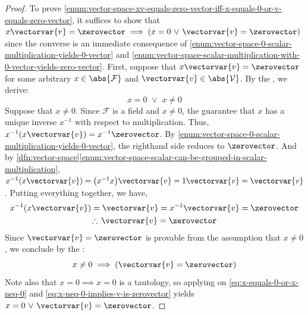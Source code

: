 \begin{proof}
    \vspace{0.3cm}
    \noindent
    To prove \ref{enum:vector-space-xv-equals-zero-vector-iff-x-equals-0-or-v-equals-zero-vector}, it suffices to show that
    \( x\vectorvar{v} = \zerovector \implies \mleft( x = 0 \,\,{\lor}\,\, \vectorvar{v} = \zerovector \mright) \) since
    the converse is an immediate consequence of \ref{enum:vector-space-0-scalar-multiplication-yields-0-vector}
    and \ref{enum:vector-space-scalar-multiplication-with-0-vector-yields-zero-vector}. First, suppose that \( x\vectorvar{v} = \zerovector \)
    for some arbitrary \( x \in \abs{\mathcal{F}} \) and \( \vectorvar{v} \in \abs{\mathcal{V}} \).
    By the , we derive:
    \begin{equation}
        \label{eq:x-equals-0-or-x-neq-0}
        x = 0 \,\,{\lor}\,\, x \neq 0
    \end{equation}
    Suppose that \( x \neq 0 \). Since \( \mathcal{F} \) is a field and \( x \neq 0 \),
    the  guarantee
    that \( x \) has a unique inverse \( x^{-1} \) with respect to multiplication. Thus,
    \( x^{-1}\mleft( x\vectorvar{v} \mright) = x^{-1}\zerovector \). By \ref{enum:vector-space-0-scalar-multiplication-yields-0-vector},
    the righthand side reduces to \( \zerovector \). And by \cref{dfn:vector-space}\ref{enum:vector-space-scalar-can-be-grouped-in-scalar-multiplication},
    \( x^{-1}\mleft( x\vectorvar{v} \mright) = \mleft( x^{-1}x \mright)\vectorvar{v} = 1\vectorvar{v} = \vectorvar{v} \). Putting everything together, we have,
    \begin{gather*}
        x^{-1}\mleft( x\vectorvar{v} \mright) = \vectorvar{v} = x^{-1}\vectorvar{v} = \zerovector\\
        \therefore \, \vectorvar{v} = \zerovector
    \end{gather*}
    Since \( \vectorvar{v} = \zerovector \) is provable from the assumption that \( x \neq 0 \), we conclude by the :
    \begin{equation}
        \label{eq:x-neq-0-implies-v-is-zerovector}
        x \neq 0 \implies \mleft( \vectorvar{v} = \zerovector \mright)
    \end{equation}
    Note also that \( x = 0 {\implies} x = 0 \) is a tautology,
    so applying  on \eqref{eq:x-equals-0-or-x-neq-0} and
    \eqref{eq:x-neq-0-implies-v-is-zerovector} yields \( x = 0 \,\,{\lor}\,\, \vectorvar{v} = \zerovector \).
\end{proof}

